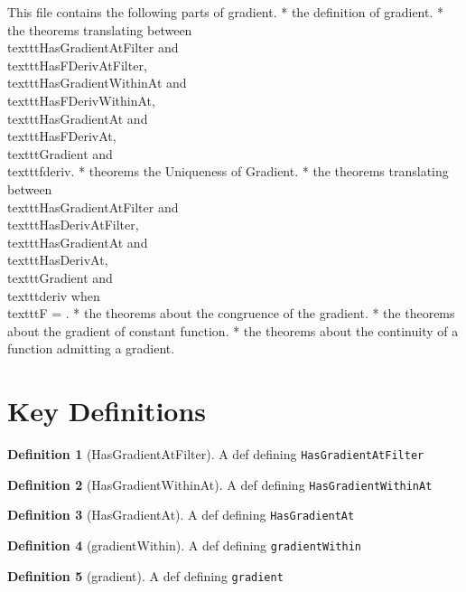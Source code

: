 \documentclass{article}
\theoremstyle{definition}
\newtheorem{definition}{Definition}
\begin{document}
This file contains the following parts of gradient.
* the definition of gradient.
* the theorems translating between \\texttt{HasGradientAtFilter} and \\texttt{HasFDerivAtFilter},
  \\texttt{HasGradientWithinAt} and \\texttt{HasFDerivWithinAt}, \\texttt{HasGradientAt} and \\texttt{HasFDerivAt},
  \\texttt{Gradient} and \\texttt{fderiv}.
* theorems the Uniqueness of Gradient.
* the theorems translating between  \\texttt{HasGradientAtFilter} and \\texttt{HasDerivAtFilter},
  \\texttt{HasGradientAt} and \\texttt{HasDerivAt}, \\texttt{Gradient} and \\texttt{deriv} when \\texttt{F = }.
* the theorems about the congruence of the gradient.
* the theorems about the gradient of constant function.
* the theorems about the continuity of a function admitting a gradient.

\section{Key Definitions}
\begin{definition}[HasGradientAtFilter]
A def defining \texttt{HasGradientAtFilter}
\end{definition}

\begin{definition}[HasGradientWithinAt]
A def defining \texttt{HasGradientWithinAt}
\end{definition}

\begin{definition}[HasGradientAt]
A def defining \texttt{HasGradientAt}
\end{definition}

\begin{definition}[gradientWithin]
A def defining \texttt{gradientWithin}
\end{definition}

\begin{definition}[gradient]
A def defining \texttt{gradient}
\end{definition}
\end{document}
